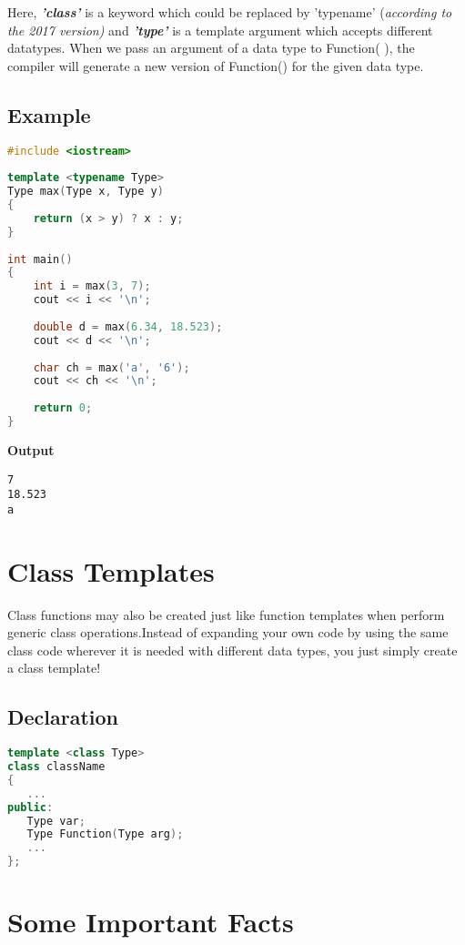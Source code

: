 \documentclass[11pt,fleqn]{book} %
\begin{document}
Here, \textbf{\textit{'class'}} is a keyword which could be replaced by 'typename' {(\it{according to the 2017 version})} and \textbf{\textit{'type'}} is a template argument which accepts different datatypes. When we pass an argument of a data type to Function( ), the compiler will generate a new version of Function() for the given data type.\\

\subsection{Example}

\begin{lstlisting}[language=C++, caption= Eg:Function Template to output the greater number
]
#include <iostream>
 
template <typename Type>
Type max(Type x, Type y)
{
    return (x > y) ? x : y;
}
 
int main()
{
    int i = max(3, 7);
    cout << i << '\n';
 
    double d = max(6.34, 18.523);
    cout << d << '\n';
 
    char ch = max('a', '6');
    cout << ch << '\n';
 
    return 0;
}
\end{lstlisting}
\textbf{Output}
\begin{lstlisting}
7
18.523
a
\end{lstlisting}

\section{Class Templates}
Class functions may also be created just like function templates when perform generic class operations.Instead of expanding your own code by using the same class code wherever it is needed with different data types, you just simply create a class template!

\subsection{Declaration}
\begin{lstlisting}[language=C++, caption= Declaration Of Class Templates]
template <class Type>
class className
{
   ...
public:
   Type var;
   Type Function(Type arg);
   ... 
};
\end{lstlisting}

\section{Some Important Facts}
\end{document}
